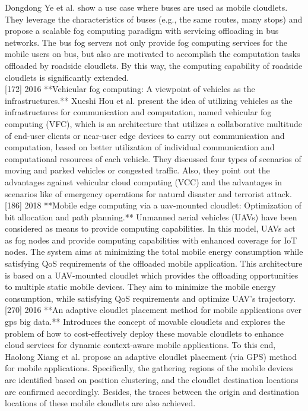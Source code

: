 Dongdong Ye et al. \cite{ye2016scalable} show a use case where buses are used as mobile cloudlets. They leverage the characteristics of buses (e.g., the same routes, many stops) and propose a scalable fog computing paradigm with servicing offloading in bus networks. The bus fog servers not only provide fog computing services for the mobile users on bus, but also are motivated to accomplish the computation tasks offloaded by roadside cloudlets. By this way, the computing capability of roadside cloudlets is significantly extended.\\

[172] 2016 **Vehicular fog computing: A viewpoint of vehicles as the infrastructures.**
Xueshi Hou et al. present the idea of utilizing vehicles as the infrastructures for communication and computation, named vehicular fog computing (VFC), which is an architecture that utilizes a collaborative multitude of end-user clients or near-user edge devices to carry out communication and computation, based on better utilization of individual communication and computational resources of each vehicle. They discussed four types of scenarios of moving and parked vehicles or congested traffic. Also, they point out the advantages against vehicular cloud computing (VCC) and the advantages in scenarios like of emergency operations for natural disaster and terrorist attack.\\

[186] 2018 **Mobile edge computing via a uav-mounted cloudlet: Optimization of bit allocation and path planning.**
Unmanned aerial vehicles (UAVs) have been considered as means to provide computing capabilities. In this model, UAVs act as fog nodes and provide computing capabilities with enhanced coverage for IoT nodes. The system aims at minimizing the total mobile energy consumption while satisfying QoS requirements of the offloaded mobile application. This architecture is based on a UAV-mounted cloudlet which provides the offloading opportunities to multiple static mobile devices. They aim to minimize the mobile energy consumption, while satisfying QoS requirements and optimize UAV’s trajectory.\\

[270] 2016 **An adaptive cloudlet placement method for mobile applications over gps big data.**
Introduces the concept of movable cloudlets and explores the problem of how to cost-effectively deploy these movable cloudlets to enhance cloud services for dynamic context-aware mobile applications. To this end, Haolong Xiang et al. propose an adaptive cloudlet placement (via GPS) method for mobile applications. Specifically, the gathering regions of the mobile devices are identified based on position clustering, and the cloudlet destination locations are confirmed accordingly. Besides, the traces between the origin and destination locations of these mobile cloudlets are also achieved.\\

